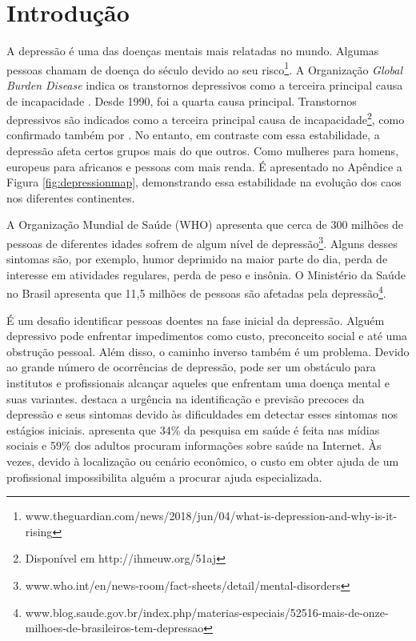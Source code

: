 \documentclass[11pt, notitlepage]{article} %
\begin{document}
\section*{Introdução}

A depressão é uma das doenças mentais mais relatadas no mundo. Algumas pessoas chamam de doença do século devido ao seu risco\footnote{www.theguardian.com/news/2018/jun/04/what-is-depression-and-why-is-it-rising}. 
A Organização \emph{Global Burden Disease} indica os transtornos depressivos como a terceira principal causa de incapacidade \cite{IHME}. Desde 1990, foi a quarta causa principal. 
Transtornos depressivos são indicados como a terceira principal causa de incapacidade\footnote{Disponível em http://ihmeuw.org/51aj}, como confirmado também por \cite{brody2018prevalence}. No entanto, em contraste com essa estabilidade, a depressão afeta certos grupos mais do que outros. Como mulheres para homens, europeus para africanos e pessoas com mais renda. É apresentado no Apêndice a Figura \ref{fig:depressionmap}, demonstrando essa estabilidade na evolução dos caos nos diferentes continentes.

A Organização Mundial de Saúde (WHO) apresenta que cerca de 300 milhões de pessoas de diferentes idades sofrem de algum nível de depressão\footnote{www.who.int/en/news-room/fact-sheets/detail/mental-disorders}. 
Alguns desses sintomas são, por exemplo, humor deprimido na maior parte do dia, perda de interesse em atividades regulares, perda de peso e insônia.
O Ministério da Saúde no Brasil apresenta que 11,5 milhões de pessoas são afetadas pela depressão\footnote{www.blog.saude.gov.br/index.php/materias-especiais/52516-mais-de-onze-milhoes-de-brasileiros-tem-depressao}.

É um desafio identificar pessoas doentes na fase inicial da depressão. Alguém depressivo pode enfrentar impedimentos como custo, preconceito social e até uma obstrução pessoal. Além disso, o caminho inverso também é um problema. Devido ao grande número de ocorrências de depressão, pode ser um obstáculo para institutos e profissionais alcançar aqueles que enfrentam uma doença mental e suas variantes. \cite{Lech2014} destaca a urgência na identificação e previsão precoces da depressão e seus sintomas devido às dificuldades em detectar esses sintomas nos estágios iniciais. \cite{elkin2008america} apresenta que 34\% da pesquisa em saúde é feita nas mídias sociais e 59\% dos adultos procuram informações sobre saúde na Internet.
Às vezes, devido à localização ou cenário econômico, o custo em obter ajuda de um profissional impossibilita alguém a procurar ajuda especializada.
\end{document}
